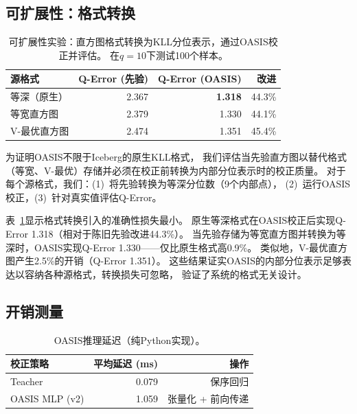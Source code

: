 \documentclass[runningheads]{llncs}
\begin{document}
\subsection{可扩展性：格式转换}
\label{sec:extensibility}

\begin{table}[t]
  \centering
  \caption{可扩展性实验：直方图格式转换为KLL分位表示，通过OASIS校正并评估。
           在$q{=}10$下测试100个样本。}
  \label{tab:extensibility}
  \begin{tabular}{l rrr}
    \toprule
    源格式 & Q-Error (先验) & Q-Error (OASIS) & 改进 \\
    \midrule
    等深（原生）  & 2.367 & \textbf{1.318} & 44.3\% \\
    等宽直方图 & 2.379 & 1.330          & 44.1\% \\
    V-最优直方图  & 2.474 & 1.351          & 45.4\% \\
    \bottomrule
  \end{tabular}
\end{table}

为证明OASIS不限于Iceberg的原生KLL格式，
我们评估当先验直方图以替代格式（等宽、V-最优）存储并必须在校正前转换为内部分位表示时的校正质量。
对于每个源格式，我们：(1)~将先验转换为等深分位数（9个内部点），
(2)~运行OASIS校正，(3)~针对真实值评估Q-Error。

表~\ref{tab:extensibility}显示格式转换引入的准确性损失最小。
原生等深格式在OASIS校正后实现Q-Error 1.318（相对于陈旧先验改进44.3\%）。
当先验存储为等宽直方图并转换为等深时，OASIS实现Q-Error 1.330——仅比原生格式高0.9\%。
类似地，V-最优直方图产生2.5\%的开销（Q-Error 1.351）。
这些结果证实OASIS的内部分位表示足够表达以容纳各种源格式，转换损失可忽略，
验证了系统的格式无关设计。

\subsection{开销测量}
\label{sec:overhead_exp}

\begin{table}[t]
  \centering
  \caption{OASIS推理延迟（纯Python实现）。}
  \label{tab:overhead}
  \begin{tabular}{l rr}
    \toprule
    校正策略 & 平均延迟 (ms) & 操作 \\
    \midrule
    Teacher             & 0.079       & 保序回归 \\
    OASIS MLP (v2)      & 1.059       & 张量化 + 前向传递 \\
    \bottomrule
  \end{tabular}
\end{table}
\end{document}
